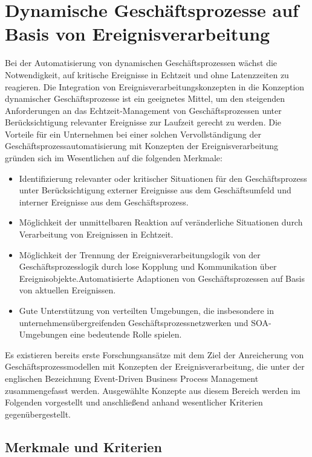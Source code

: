 \section{Dynamische Geschäftsprozesse auf Basis von Ereignisverarbeitung}\label{sec:Kombi}
Bei der Automatisierung von dynamischen Geschäftsprozessen wächst die Notwendigkeit, auf kritische Ereignisse in Echtzeit und ohne Latenzzeiten zu reagieren. 
Die Integration von Ereignisverarbeitungskonzepten in die Konzeption dynamischer Geschäftsprozesse ist ein geeignetes Mittel, um den steigenden Anforderungen an das Echtzeit-Management von Geschäftsprozessen unter Berücksichtigung relevanter Ereignisse zur Laufzeit gerecht zu werden. 
\cite{Abolhassan.2016}
Die Vorteile für ein Unternehmen bei einer solchen Vervollständigung der Geschäftsprozessautomatisierung mit Konzepten der Ereignisverarbeitung gründen sich im Wesentlichen auf die folgenden Merkmale:

\begin{itemize}
    \item 
    Identifizierung relevanter oder kritischer Situationen für den Geschäftsprozess unter Berücksichtigung externer Ereignisse aus dem Geschäftsumfeld und interner Ereignisse aus dem Geschäftsprozess.
    \item 
    Möglichkeit der unmittelbaren Reaktion auf veränderliche Situationen durch Verarbeitung von Ereignissen in Echtzeit.
    \item
    Möglichkeit der Trennung der Ereignisverarbeitungslogik von der Geschäftsprozesslogik durch lose Kopplung und Kommunikation über Ereignisobjekte.Automatisierte Adaptionen von Geschäftsprozessen auf Basis von aktuellen Ereignissen.
    \item
    Gute Unterstützung von verteilten Umgebungen, die insbesondere in unternehmensübergreifenden Geschäftsprozessnetzwerken und \ac{SOA}-Umgebungen eine bedeutende Rolle spielen.
\end{itemize}

Es existieren bereits erste Forschungsansätze mit dem Ziel der Anreicherung von Geschäftsprozessmodellen mit Konzepten der Ereignisverarbeitung, die unter der englischen Bezeichnung Event-Driven Business Process Management zusammengefasst werden. Ausgewählte Konzepte aus diesem Bereich werden im Folgenden vorgestellt und anschließend anhand wesentlicher Kriterien gegenübergestellt.

\subsection{Merkmale und Kriterien}

